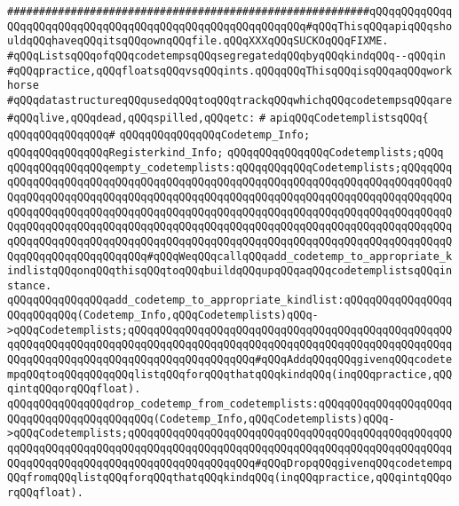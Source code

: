 \verb|#########################################################qQQqqQQqqQQqqQQqqQQqqQQqqQQqqQQqqQQqqQQqqQQqqQQqqQQqqQQqqQQq#qQQqThisqQQqapiqQQqshouldqQQqhaveqQQqitsqQQqownqQQqfile.qQQqXXXqQQqSUCKOqQQqFIXME.|\newline
\verb|#qQQqListsqQQqofqQQqcodetempsqQQqsegregatedqQQqbyqQQqkindqQQq--qQQqin|\newline
\verb|#qQQqpractice,qQQqfloatsqQQqvsqQQqints.qQQqqQQqThisqQQqisqQQqaqQQqworkhorse|\newline
\verb|#qQQqdatastructureqQQqusedqQQqtoqQQqtrackqQQqwhichqQQqcodetempsqQQqare|\newline
\verb|#qQQqlive,qQQqdead,qQQqspilled,qQQqetc:|\newline
\verb|#|\newline
\verb|apiqQQqCodetemplistsqQQq{|\newline
\verb|qQQqqQQqqQQqqQQq#|\newline
\verb|qQQqqQQqqQQqqQQqCodetemp_Info;|\newline
\verb|qQQqqQQqqQQqqQQqRegisterkind_Info;|\newline
\verb|qQQqqQQqqQQqqQQqCodetemplists;qQQq|\newline
\newline
\verb|qQQqqQQqqQQqqQQqempty_codetemplists:qQQqqQQqqQQqCodetemplists;qQQqqQQqqQQqqQQqqQQqqQQqqQQqqQQqqQQqqQQqqQQqqQQqqQQqqQQqqQQqqQQqqQQqqQQqqQQqqQQqqQQqqQQqqQQqqQQqqQQqqQQqqQQqqQQqqQQqqQQqqQQqqQQqqQQqqQQqqQQqqQQqqQQqqQQqqQQqqQQqqQQqqQQqqQQqqQQqqQQqqQQqqQQqqQQqqQQqqQQqqQQqqQQqqQQqqQQqqQQqqQQqqQQqqQQqqQQqqQQqqQQqqQQqqQQqqQQqqQQqqQQqqQQqqQQqqQQqqQQqqQQqqQQqqQQqqQQqqQQqqQQqqQQqqQQqqQQqqQQqqQQqqQQqqQQqqQQqqQQqqQQqqQQqqQQqqQQqqQQqqQQqqQQqqQQqqQQqqQQq#qQQqWeqQQqcallqQQqadd_codetemp_to_appropriate_kindlistqQQqonqQQqthisqQQqtoqQQqbuildqQQqupqQQqaqQQqcodetemplistsqQQqinstance.|\newline
\newline
\verb|qQQqqQQqqQQqqQQqadd_codetemp_to_appropriate_kindlist:qQQqqQQqqQQqqQQqqQQqqQQqqQQq(Codetemp_Info,qQQqCodetemplists)qQQq->qQQqCodetemplists;qQQqqQQqqQQqqQQqqQQqqQQqqQQqqQQqqQQqqQQqqQQqqQQqqQQqqQQqqQQqqQQqqQQqqQQqqQQqqQQqqQQqqQQqqQQqqQQqqQQqqQQqqQQqqQQqqQQqqQQqqQQqqQQqqQQqqQQqqQQqqQQqqQQqqQQqqQQqqQQq#qQQqAddqQQqqQQqgivenqQQqcodetempqQQqtoqQQqqQQqqQQqlistqQQqforqQQqthatqQQqkindqQQq(inqQQqpractice,qQQqintqQQqorqQQqfloat).|\newline
\verb|qQQqqQQqqQQqqQQqdrop_codetemp_from_codetemplists:qQQqqQQqqQQqqQQqqQQqqQQqqQQqqQQqqQQqqQQqqQQq(Codetemp_Info,qQQqCodetemplists)qQQq->qQQqCodetemplists;qQQqqQQqqQQqqQQqqQQqqQQqqQQqqQQqqQQqqQQqqQQqqQQqqQQqqQQqqQQqqQQqqQQqqQQqqQQqqQQqqQQqqQQqqQQqqQQqqQQqqQQqqQQqqQQqqQQqqQQqqQQqqQQqqQQqqQQqqQQqqQQqqQQqqQQqqQQqqQQq#qQQqDropqQQqgivenqQQqcodetempqQQqfromqQQqlistqQQqforqQQqthatqQQqkindqQQq(inqQQqpractice,qQQqintqQQqorqQQqfloat).|\newline
